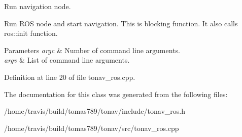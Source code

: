 Run navigation node. 

Run R\-O\-S node and start navigation. This is blocking function. It also calls {\ttfamily ros\-::init} function.


\begin{DoxyParams}{Parameters}
{\em argc} & Number of command line arguments. \\
\hline
{\em argv} & List of command line arguments. \\
\hline
\end{DoxyParams}


Definition at line 20 of file tonav\-\_\-ros.\-cpp.



The documentation for this class was generated from the following files\-:\begin{DoxyCompactItemize}
\item 
/home/travis/build/tomas789/tonav/include/tonav\-\_\-ros.\-h\item 
/home/travis/build/tomas789/tonav/src/tonav\-\_\-ros.\-cpp\end{DoxyCompactItemize}
